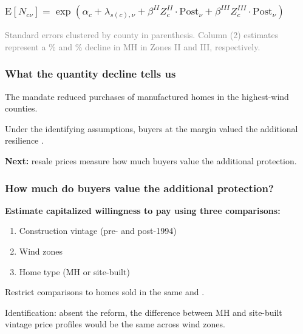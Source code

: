\documentclass[11pt,xcolor={dvipsnames},hyperref={pdftex,pdfpagemode=UseNone,hidelinks,pdfdisplaydoctitle=true},usepdftitle=false,aspectratio=169]{beamer}
\newcommand{\gc}[1]{{\footnotesize\textcolor{gray}{#1}}}
\begin{document}
\begin{frame}\label{frame:quantity-static}
    \frametitle{$\mathrm{E}[N_{c\nu}] = \exp\!\left(\alpha_c + \lambda_{s(c),\nu} + \beta^{II} Z^{II}_c \cdot \mathrm{Post}_\nu + \beta^{III} Z^{III}_c \cdot \mathrm{Post}_\nu\right)$}

    \vspace{-0.5em}

    \begin{table}
    \centering
    \resizebox*{!}{0.80\textheight}{}
    \end{table}

    \par \gc{Standard errors clustered by county in parenthesis. Column (2) estimates represent a \vClQtyZoneTwoPct\% and \vClQtyZoneThreePct\% decline in MH in Zones II and III, respectively.} \hfill \hyperlink{frame:census-quantity}{}
\end{frame}

\begin{frame}
    \frametitle{What the quantity decline tells us}
    The mandate reduced purchases of manufactured homes in the highest-wind counties.

    \vspace{1em}
    Under the identifying assumptions, buyers at the margin valued the additional resilience .

    \vspace{1em}
    \textbf{Next:} resale prices measure how much buyers value the additional protection.
\end{frame}

\begin{frame}[t]

    \frametitle{How much do buyers value the additional protection?}
    \textbf{Estimate capitalized willingness to pay using three comparisons:}

    \pause

    \vspace{0.5em}
    \begin{enumerate}\setlength{\itemsep}{1em}
        \item Construction vintage (pre- and post-1994)
        \item Wind zones
        \item Home type (MH or site-built)
    \end{enumerate}

    \vspace{0.8em}

    Restrict comparisons to homes sold in the same  and .

    \pause

    \vspace{2em}

    Identification: absent the reform, the difference between MH and site-built vintage price profiles would be the same across wind zones.

\end{frame}
\end{document}
